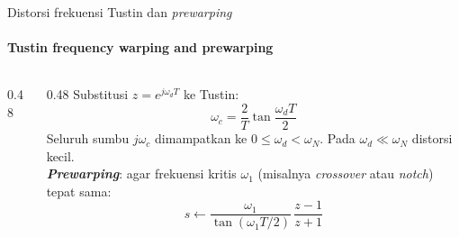 \documentclass[aspectratio=169,10pt]{beamer}
\begin{document}
\begin{frame}{Distorsi frekuensi Tustin dan \textit{prewarping}}
	\framesubtitle{Tustin frequency warping and prewarping}
	\begin{columns}[c]
		\begin{column}{0.48\textwidth}
			\centering
		\end{column}
		\begin{column}{0.48\textwidth}
			\small
			Substitusi $z=e^{j\omega_dT}$ ke Tustin:
			\[
				\omega_c = \frac{2}{T}\tan\frac{\omega_d T}{2}
			\]
			Seluruh sumbu $j\omega_c$ dimampatkan ke $0 \le \omega_d < \omega_N$. Pada $\omega_d \ll \omega_N$ distorsi kecil.\\[4pt]
			\textbf{\textit{Prewarping}}: agar frekuensi kritis $\omega_1$ (misalnya \textit{crossover} atau \textit{notch}) tepat sama:
			\[
				s \leftarrow \frac{\omega_1}{\tan(\omega_1 T/2)}\,\frac{z-1}{z+1}
			\]
		\end{column}
	\end{columns}
\end{frame}
\end{document}
